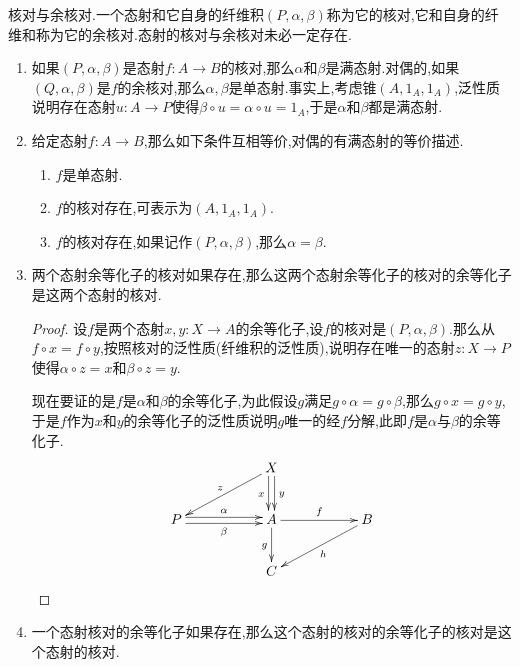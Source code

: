 核对与余核对.一个态射和它自身的纤维积$(P,\alpha,\beta)$称为它的核对,它和自身的纤维和称为它的余核对.态射的核对与余核对未必一定存在.
\begin{enumerate}
	\item 如果$(P,\alpha,\beta)$是态射$f:A\to B$的核对,那么$\alpha$和$\beta$是满态射.对偶的,如果$(Q,\alpha,\beta)$是$f$的余核对,那么$\alpha,\beta$是单态射.事实上,考虑锥$(A,1_A,1_A)$,泛性质说明存在态射$u:A\to P$使得$\beta\circ u=\alpha\circ u=1_A$,于是$\alpha$和$\beta$都是满态射.
	\item 给定态射$f:A\to B$,那么如下条件互相等价,对偶的有满态射的等价描述.
	\begin{enumerate}
		\item $f$是单态射.
		\item $f$的核对存在,可表示为$(A,1_A,1_A)$.
		\item $f$的核对存在,如果记作$(P,\alpha,\beta)$,那么$\alpha=\beta$.
	\end{enumerate}
    \item 两个态射余等化子的核对如果存在,那么这两个态射余等化子的核对的余等化子是这两个态射的核对.
    \begin{proof}
    	
    	设$f$是两个态射$x,y:X\to A$的余等化子,设$f$的核对是$(P,\alpha,\beta)$.那么从$f\circ x=f\circ y$,按照核对的泛性质(纤维积的泛性质),说明存在唯一的态射$z:X\to P$使得$\alpha\circ z=x$和$\beta\circ z=y$.
    	
    	现在要证的是$f$是$\alpha$和$\beta$的余等化子,为此假设$g$满足$g\circ\alpha=g\circ\beta$,那么$g\circ x=g\circ y$,于是$f$作为$x$和$y$的余等化子的泛性质说明$g$唯一的经$f$分解,此即$f$是$\alpha$与$\beta$的余等化子.
    	$$\xymatrix{&&X\ar@<0.5ex>[d]^y\ar@<-0.5ex>[d]_x\ar[dll]_z&&\\P\ar@<0.5ex>[rr]^{\alpha}\ar@<-0.5ex>[rr]_{\beta}&&A\ar[rr]^f\ar[d]_g&&B\ar[dll]^h\\&&C&&}$$
    \end{proof}
    \item 一个态射核对的余等化子如果存在,那么这个态射的核对的余等化子的核对是这个态射的核对.
\end{enumerate}

